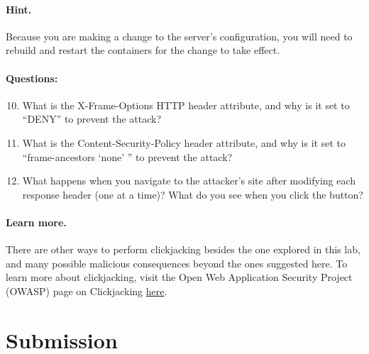 \paragraph{Hint.} Because you are making a change to the server's
configuration, you will need to rebuild and restart the containers for
the change to take effect.


\paragraph{Questions:}
\begin{enumerate}
\setcounter{enumi}{9}
    \item What is the X-Frame-Options HTTP header attribute, and why is
    it set to ``DENY'' to prevent the attack?

    \item What is the Content-Security-Policy header attribute, and why
    is it set to ``frame-ancestors `none' '' to prevent the attack?

    \item What happens when you navigate to the attacker's site
    after modifying each response header (one at a time)? What do you
    see when you click the button?
\end{enumerate}

\paragraph{Learn more.}
There are other ways to perform clickjacking besides the one
explored in this lab, and many possible malicious consequences beyond
the ones suggested here. To learn more about clickjacking, visit the
Open Web Application Security Project (OWASP) page on Clickjacking 
\href{https://owasp.org/www-community/attacks/Clickjacking}{here}.

\section{Submission}

\begin{quote}
\seedsubmission
\end{quote}



